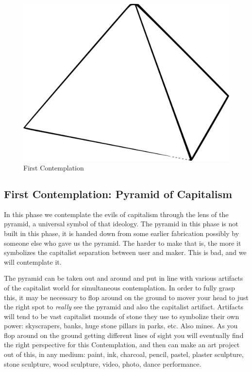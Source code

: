 \begin{figure}[htbp]
\centering
\includegraphics{images/contemplations/contemplation1C.png}
\caption{First Contemplation}
\end{figure}

\subsection{First Contemplation: Pyramid of
Capitalism}\label{first-contemplation-pyramid-of-capitalism}

In this phase we contemplate the evils of capitalism through the lens of
the pyramid, a universal symbol of that ideology. The pyramid in this
phase is not built in this phase, it is handed down from some earlier
fabrication possibly by someone else who gave us the pyramid. The harder
to make that is, the more it symbolizes the capitalist separation
between user and maker. This is bad, and we will contemplate it.

The pyramid can be taken out and around and put in line with various
artifacts of the capitalist world for simultaneous contemplation. In
order to fully grasp this, it may be necessary to flop around on the
ground to mover your head to just the right spot to \emph{really} see
the pyramid and also the capitalist artifact. Artifacts will tend to be
vast capitalist mounds of stone they use to symbolize their own power:
skyscrapers, banks, huge stone pillars in parks, etc. Also mines. As you
flop around on the ground getting different lines of sight you will
eventually find the right perspective for this Contemplation, and then
can make an art project out of this, in any medium: paint, ink,
charcoal, pencil, pastel, plaster sculpture, stone sculpture, wood
sculpture, video, photo, dance performance.

